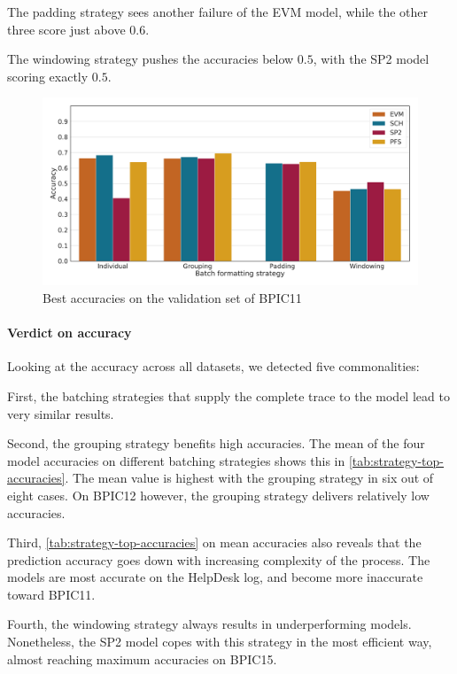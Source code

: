 The padding strategy sees another failure of the EVM model, while the other three score just above $0.6$.

The windowing strategy pushes the accuracies below $0.5$, with the SP2 model scoring exactly $0.5$.

\begin{figure}[!htb]
    \centering
    \includegraphics[width=\textwidth]{gfx/bpic2011/accuracies.pdf}
    \caption{Best accuracies on the validation set of BPIC11}
    \label{fig:max-accuracies-bpic2011}
\end{figure}

\paragraph{Verdict on accuracy}
Looking at the accuracy across all datasets, we detected five commonalities:

First, the batching strategies that supply the complete trace to the model lead to very similar results.

Second, the grouping strategy benefits high accuracies.
The mean of the four model accuracies on different batching strategies shows this in \autoref{tab:strategy-top-accuracies}.
The mean value is highest with the grouping strategy in six out of eight cases.
On BPIC12 however, the grouping strategy delivers relatively low accuracies.

Third, \autoref{tab:strategy-top-accuracies} on mean accuracies also reveals that the prediction accuracy goes down with increasing complexity of the process.
The models are most accurate on the HelpDesk log, and become more inaccurate toward BPIC11.

Fourth, the windowing strategy always results in underperforming models.
Nonetheless, the SP2 model copes with this strategy in the most efficient way, almost reaching maximum accuracies on BPIC15.

